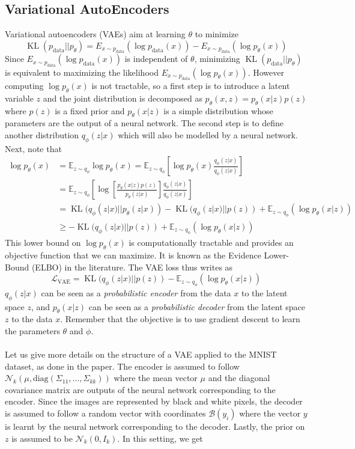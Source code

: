 \documentclass{article}
\theoremstyle{definition}
\theoremstyle{lemma}
\theoremstyle{theorem}
\DeclareMathOperator*{\data}{\text{data}}
\DeclareMathOperator*{\kl}{\text{KL}}
\begin{document}
\subsection{Variational AutoEncoders}

Variational autoencoders (VAEs) aim at learning $\theta$ to minimize $$\kl(p_{\data}||p_{\theta}) = E_{x\sim p_{\data}}(\log p_{\data}(x)) - E_{x\sim p_{\data}}(\log p_\theta(x))$$
Since $E_{x\sim p_{\data}}(\log p_{\data}(x))$ is independent of $\theta$, minimizing $\kl(p_{\data}||p_{\theta})$ is equivalent to maximizing the likelihood $E_{x\sim p_{\data}}(\log p_\theta(x))$. However computing $\log p_\theta(x)$ is not tractable, so a first step is to introduce a latent variable $z$ and the joint distribution is decomposed as $p_\theta(x, z) = p_\theta(x|z) p(z)$ where $p(z)$ is a fixed prior and $p_\theta(x|z)$ is a simple distribution whose parameters are the output of a neural network. The second step is to define another distribution $q_{\phi}(z|x)$ which will also be modelled by a neural network. Next, note that 
$$\begin{aligned}
  \log p_\theta(x) &= \mathbb{E}_{z \sim q_\phi} \log p_\theta(x) = \mathbb{E}_{z \sim q_\phi} \left[ \log p_\theta(x) \frac {q_\phi(z|x)}{q_\phi(z|x)} \right] \\
  &= \mathbb{E}_{z \sim q_\phi} \left[ \log\left[\frac{p_\theta(x|z) p(z)}{p_\theta(z|x)} \right] \frac {q_\phi(z|x)}{q_\phi(z|x)} \right]\\
  &= \kl(q_\phi(z|x)||p_\theta(z|x)) - \kl(q_\phi(z|x)||p(z)) + \mathbb{E}_{z \sim q_\phi}(\log p_\theta(x|z))\\
  &\geq - \kl(q_\phi(z|x)||p(z)) + \mathbb{E}_{z \sim q_\phi}(\log p_\theta(x|z))
\end{aligned}$$
This lower bound on $\log p_\theta(x)$ is computationally tractable and provides an objective function that we can maximize. It is known as the Evidence Lower-Bound (ELBO) in the literature. The VAE loss thus writes as $$\mathcal L_{\text{VAE}} = \kl(q_\phi(z|x)||p(z)) - \mathbb{E}_{z \sim q_\phi}(\log p_\theta(x|z)) $$
$q_\phi(z|x)$ can be seen as a \textit{probabilistic encoder} from the data $x$ to the latent space $z$, and $p_\theta(x|z)$ can be seen as a \textit{probabilistic decoder} from the latent space $z$ to the data $x$. Remember that the objective is to use gradient descent to learn the parameters $\theta$ and $\phi$.
\hfill \\ \\
Let us give more details on the structure of a VAE applied to the MNIST dataset, as done in the paper. The encoder is assumed to follow $\mathcal N_k(\mu, \text{diag}(\Sigma_{11},\ldots, \Sigma_{kk}))$ where the mean vector $\mu$ and the diagonal covariance matrix are outputs of the neural network corresponding to the encoder. Since the images are represented by black and white pixels, the decoder is assumed to follow a random vector with coordinates $\mathcal B(y_i)$ where the vector $y$ is learnt by the neural network corresponding to the decoder. Lastly, the prior on $z$ is assumed to be $\mathcal N_k(0, I_k)$. In this setting, we get 
\end{document}
